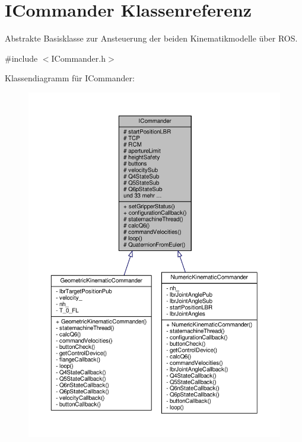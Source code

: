 \hypertarget{classICommander}{\section{I\-Commander Klassenreferenz}
\label{classICommander}
}


Abstrakte Basisklasse zur Ansteuerung der beiden Kinematikmodelle über R\-O\-S.  




{\ttfamily \#include $<$I\-Commander.\-h$>$}



Klassendiagramm für I\-Commander\-:
\nopagebreak
\begin{figure}[H]
\begin{center}
\leavevmode
\includegraphics[width=350pt]{classICommander__inherit__graph}
\end{center}
\end{figure}


